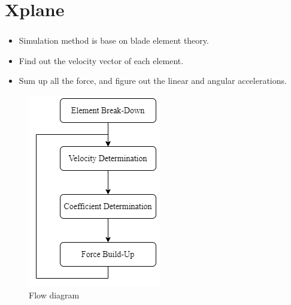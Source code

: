 \documentclass{beamer}
\begin{document}
    \section{Xplane}

    \begin{frame}
        \frametitle{\secname}
        \begin{multicols}{2}
            \begin{itemize}
                \item[1.] Simulation method is base on blade element theory.
                \item[2.] Find out the velocity vector of each element.
                \item[3.] Sum up all the force, and figure out the linear and angular accelerations.
            \end{itemize}
            \columnbreak

            \begin{figure}
                \includegraphics[scale=.3]{Figs/Xplane_simulate_flow_diagram.png}
                \caption{Flow diagram}
            \end{figure}
        \end{multicols}

    \end{frame}
\end{document}
